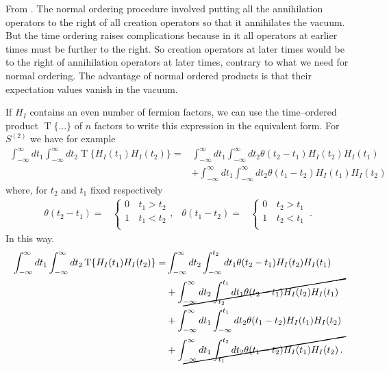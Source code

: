 From \cite{Lahiri:2005sm}. The normal ordering procedure involved putting all the annihilation operators to the right of all creation operators so that it annihilates the vacuum. But the time ordering raises complications because in it all operators at earlier times must be further to the right. So creation operators at later times would be to the right of annihilation operators at later times, contrary to what we need for normal ordering. The advantage of normal ordered products is that their expectation values vanish in the vacuum. 

If $H_I$ contains an even number of fermion factors, we can use the time--ordered product $\operatorname{T}\{\ldots\}$ of $n$ factors to write this expression in the equivalent form. For $S^{(2)}$ we have for example
\begin{align}
 \int_{-\infty}^\infty dt_1 \int_{-\infty}^{\infty}d t_2 \operatorname{T}\{H_I(t_1)H_I(t_2)\}=&
\int_{-\infty}^\infty dt_1\int_{-\infty}^{\infty}d t_2 \theta(t_2-t_1)H_I(t_2)H_I(t_1) \nonumber\\
&+\int_{-\infty}^\infty dt_1\int_{-\infty}^{\infty}d t_2 \theta(t_1-t_2)H_I(t_1)H_I(t_2)
 \end{align}
where, for $t_2$ and $t_1$ fixed respectively
 \begin{align}
   \theta(t_2-t_1)=&
   \begin{cases}
    0\, &    t_1> t_2\\
    1\, &    t_1< t_2\\
   \end{cases},&   \theta(t_1-t_2)=&
   \begin{cases}
    0\, &    t_2> t_1\\
    1\, &    t_2< t_1\\
   \end{cases}\,.
 \end{align}
In this way.
\begin{align}
 \int_{-\infty}^\infty dt_1 \int_{-\infty}^{\infty}d t_2 \operatorname{T}\{H_I(t_1)H_I(t_2)\}=&
\int_{-\infty}^\infty dt_2\int_{-\infty}^{t_2}d t_1 \theta(t_2-t_1)H_I(t_2)H_I(t_1)\nonumber\\
&+\cancel{\int_{-\infty}^\infty dt_2\int_{t_2}^{t_1}d t_1 \theta(t_2-t_1)H_I(t_2)H_I(t_1)} \nonumber\\
&+\int_{-\infty}^\infty dt_1\int_{-\infty}^{t_{1}}d t_2 \theta(t_1-t_2)H_I(t_1)H_I(t_2) \nonumber\\
&+\cancel{\int_{-\infty}^\infty dt_1\int_{t_1}^{t_2}d t_2 \theta(t_1-t_2)H_I(t_1)H_I(t_2)}\,.
\end{align}
